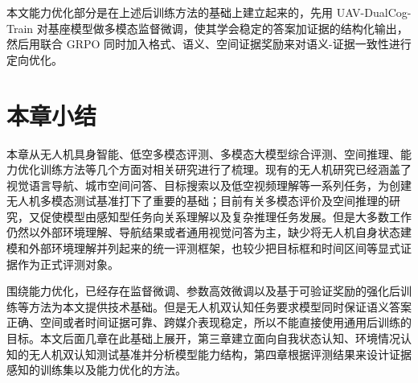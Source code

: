 本文能力优化部分是在上述后训练方法的基础上建立起来的，先用 UAV-DualCog-Train 对基座模型做多模态监督微调，使其学会稳定的答案加证据的结构化输出，然后用联合 GRPO 同时加入格式、语义、空间证据奖励来对语义-证据一致性进行定向优化。
\section{本章小结}
本章从无人机具身智能、低空多模态评测、多模态大模型综合评测、空间推理、能力优化训练方法等几个方面对相关研究进行了梳理。现有的无人机研究已经涵盖了视觉语言导航、城市空间问答、目标搜索以及低空视频理解等一系列任务，为创建无人机多模态测试基准打下了重要的基础；目前有关多模态评价及空间推理的研究，又促使模型由感知型任务向关系理解以及复杂推理任务发展。但是大多数工作仍然以外部环境理解、导航结果或者通用视觉问答为主，缺少将无人机自身状态建模和外部环境理解并列起来的统一评测框架，也较少把目标框和时间区间等显式证据作为正式评测对象。

围绕能力优化，已经存在监督微调、参数高效微调以及基于可验证奖励的强化后训练等方法为本文提供技术基础。但是无人机双认知任务要求模型同时保证语义答案正确、空间或者时间证据可靠、跨媒介表现稳定，所以不能直接使用通用后训练的目标。本文后面几章在此基础上展开，第三章建立面向自我状态认知、环境情况认知的无人机双认知测试基准并分析模型能力结构，第四章根据评测结果来设计证据感知的训练集以及能力优化的方法。
